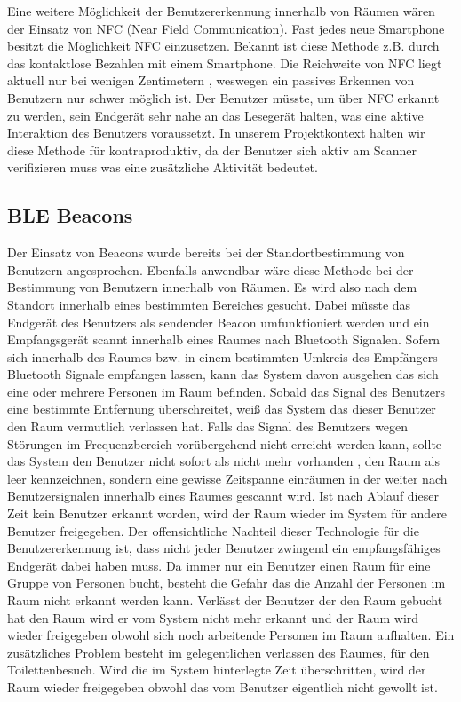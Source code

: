Eine weitere Möglichkeit der Benutzererkennung innerhalb von Räumen
wären der Einsatz von NFC (Near Field Communication). 
Fast jedes neue Smartphone besitzt die Möglichkeit NFC einzusetzen.
Bekannt ist diese Methode z.B. durch das kontaktlose Bezahlen mit einem Smartphone. 
Die Reichweite von NFC liegt aktuell nur bei wenigen Zentimetern
\cite{https://developer.android.com/guide/topics/connectivity/nfc/index.html},
weswegen ein passives Erkennen von Benutzern nur schwer möglich ist.
Der Benutzer müsste, um über NFC erkannt zu werden, sein Endgerät sehr nahe an
das Lesegerät halten, was eine aktive Interaktion des Benutzers voraussetzt.
In unserem Projektkontext halten wir diese Methode für kontraproduktiv, da der
Benutzer sich aktiv am Scanner verifizieren muss was eine zusätzliche Aktivität bedeutet.

\subsection{BLE Beacons}
\label{anhang:BLE_Beacons}

Der Einsatz von Beacons wurde bereits bei der Standortbestimmung von Benutzern
angesprochen. Ebenfalls anwendbar wäre diese Methode bei der Bestimmung von
Benutzern innerhalb von Räumen.
Es wird also nach dem Standort innerhalb eines bestimmten Bereiches gesucht.
Dabei müsste das Endgerät des Benutzers als sendender Beacon umfunktioniert
werden und ein Empfangsgerät scannt innerhalb eines Raumes nach Bluetooth
Signalen. Sofern sich innerhalb des Raumes bzw. in einem bestimmten Umkreis
des Empfängers Bluetooth Signale empfangen lassen, kann das System davon
ausgehen das sich eine oder mehrere Personen im Raum befinden. Sobald das
Signal des Benutzers eine bestimmte Entfernung überschreitet, weiß das
System das dieser Benutzer den Raum vermutlich verlassen hat. Falls das Signal
des Benutzers wegen Störungen im Frequenzbereich vorübergehend nicht erreicht
werden kann, sollte das System den Benutzer nicht sofort als nicht mehr
vorhanden , \bzw den Raum als leer kennzeichnen, sondern eine gewisse
Zeitspanne einräumen in der weiter nach Benutzersignalen innerhalb eines Raumes
gescannt wird. Ist nach Ablauf dieser Zeit kein Benutzer erkannt worden, wird
der Raum wieder im System für andere Benutzer freigegeben. Der offensichtliche
Nachteil dieser Technologie für die Benutzererkennung ist, dass nicht jeder
Benutzer zwingend ein empfangsfähiges Endgerät dabei haben muss. Da immer nur
ein Benutzer einen Raum für \zB eine Gruppe von Personen bucht, besteht die
Gefahr das die Anzahl der Personen im Raum nicht erkannt werden kann. Verlässt
der Benutzer der den Raum gebucht hat den Raum wird er vom System nicht mehr
erkannt und der Raum wird wieder freigegeben obwohl sich noch arbeitende
Personen im Raum aufhalten. Ein zusätzliches Problem besteht im
gelegentlichen verlassen des Raumes, \zB für den Toilettenbesuch. Wird die im
System hinterlegte Zeit überschritten, wird der Raum wieder freigegeben obwohl
das vom Benutzer eigentlich nicht gewollt ist.


